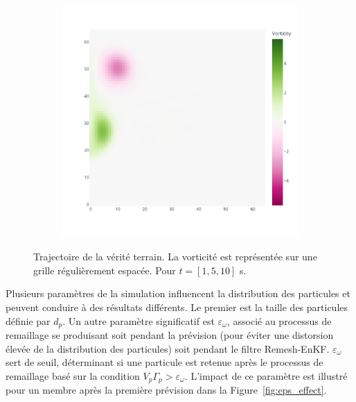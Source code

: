 \begin{figure}[htbp]
\begin{subfigure}{0.32\textwidth}
    \end{subfigure}
    \hfill
    \begin{subfigure}{0.32\textwidth}
        \includegraphics[width=\linewidth]{images/app2d/best_estimate_20.pdf}
    \end{subfigure}
    \caption{Trajectoire de la vérité terrain. La vorticité est représentée sur une grille régulièrement espacée. Pour $t=[1, 5, 10]$ s.}
    \label{fig:ref_trajectory}
\end{figure}


Plusieurs paramètres de la simulation influencent la distribution des particules et peuvent conduire à des résultats différents. Le premier est la taille des particules définie par \(d_p\). Un autre paramètre significatif est \(\varepsilon_\omega\), associé au processus de remaillage se produisant soit pendant la prévision (pour éviter une distorsion élevée de la distribution des particules) soit pendant le filtre Remesh-EnKF. \(\varepsilon_\omega\) sert de seuil, déterminant si une particule est retenue après le processus de remaillage basé sur la condition \(V_p \Gamma_p > \varepsilon_\omega\). L'impact de ce paramètre est illustré pour un membre après la première prévision dans la Figure~\ref{fig:eps_effect}.

